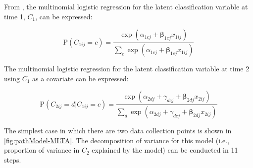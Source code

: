 \documentclass[man]{apa6}
\begin{document}
From \citet{asparouhov2008}, the multinomial logistic regression for the latent classification variable at time 1, $C_1$, can be expressed:

\begin{equation}
\textrm{P}(C_{1ij}=c)=\frac{\exp(\alpha_{1cj}+\boldsymbol{\beta}_{1cj}x_{1ij})}{\sum_c \exp(\alpha_{1cj}+\boldsymbol{\beta}_{1cj}x_{1ij})}
\end{equation}

The multinomial logistic regression for the latent classification variable at time 2 using $C_1$ as a covariate can be expressed:

\begin{equation}
\textrm{P}(C_{2ij}=d \vert C_{1ij}=c)=\frac{\exp(\alpha_{2dj}+\gamma_{dcj}+\boldsymbol{\beta}_{2dj}x_{2ij})}{\sum_d \exp(\alpha_{2dj}+ \gamma_{dcj} +\boldsymbol{\beta}_{2dj}x_{2ij})}
\end{equation}

The simplest case in which there are two data collection points is shown in \autoref{fig:pathModel-MLTA}.  The decomposition of variance for this model (i.e., proportion of variance in $C_2$ explained by the model) can be conducted in 11 steps.
\end{document}
